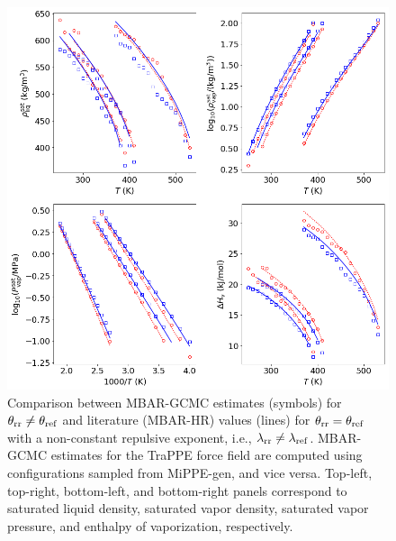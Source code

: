 \documentclass[journal=jced,manuscript=article]{achemso}
\begin{document}
	\begin{figure}[htb!]
		\centering
		\includegraphics[width=6.4in]{refFF_to_rrFF_lam_12to16.png}
		\caption{Comparison between MBAR-GCMC estimates (symbols) for $\theta_{\rm rr} \neq \theta_{\rm ref}$ and literature (MBAR-HR) values (lines) for $\theta_{\rm rr} = \theta_{\rm ref}$ with a non-constant repulsive exponent, i.e., $\lambda_{\rm rr} \neq \lambda_{\rm ref}$. MBAR-GCMC estimates for the TraPPE force field are computed using configurations sampled from MiPPE-gen, and vice versa. Top-left, top-right, bottom-left, and bottom-right panels correspond to saturated liquid density, saturated vapor density, saturated vapor pressure, and enthalpy of vaporization, respectively.}
		\label{fig:refFF_to_rrFF_lam12to16}
	\end{figure}
\end{document}

